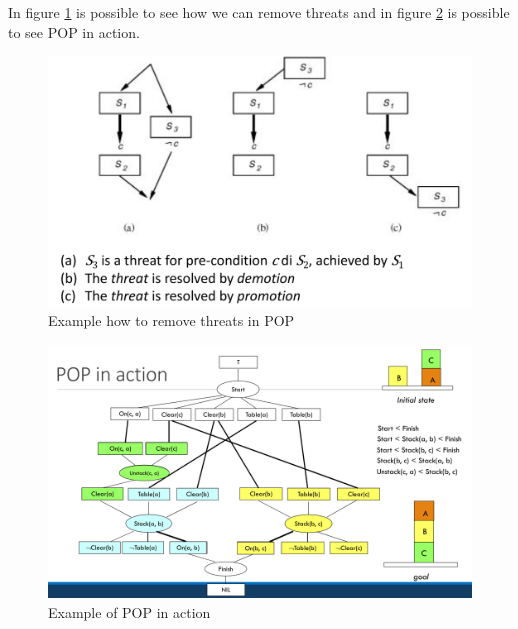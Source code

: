 In figure \ref{img:threats} is possible to see how we can remove threats and in figure 
\ref{img:POPExample} is possible to see POP in action.

\begin{figure}
	\includegraphics[width=\textwidth]{Images/threats}
	\caption{Example how to remove threats in POP}
	\label{img:threats}
\end{figure}
\begin{figure}
	\includegraphics[width=\textwidth]{Images/POPExample}
	\caption{Example of POP in action}
	\label{img:POPExample}
\end{figure}
